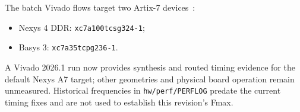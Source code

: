 The batch Vivado flows target two Artix-7 devices~\cite{artix7}:
\begin{itemize}
  \item Nexys 4 DDR: \texttt{xc7a100tcsg324-1};
  \item Basys 3: \texttt{xc7a35tcpg236-1}.
\end{itemize}
A Vivado 2026.1 run now provides synthesis and routed timing evidence for the
default Nexys A7 target; other geometries and physical board operation remain
unmeasured. Historical frequencies in \texttt{hw/perf/PERFLOG} predate the
current timing fixes and are not used to establish this revision's Fmax.
